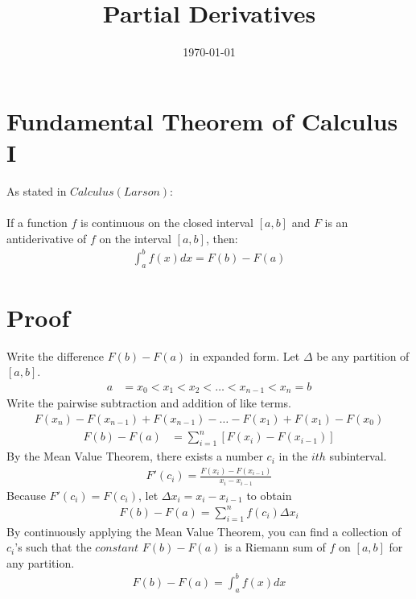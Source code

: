 \documentclass[a4paper, 12pt]{article}
\begin{document}
\title{Partial Derivatives}
\date{\today}
\pagestyle{empty} 
\section{Fundamental Theorem of Calculus I}
As stated in $Calculus(Larson)$: \\
\\
	If a function $f$ is continuous on the closed interval $[a, b]$ and $F$ is an antiderivative of $f$ on the interval $[a, b]$, then:
\begin{align}
	\int_a^b f(x) dx = F(b) - F(a)
\end{align}
\section{Proof}
	Write the difference $F(b) - F(a)$ in expanded form.  Let $\Delta$ be any partition of $[a, b]$.
\begin{align*}
	a &= x_0 < x_1 < x_2 < \ldots < x_{n-1} < x_n = b
\end{align*}
	Write the pairwise subtraction and addition of like terms.
\begin{align*}
	F(x_n) - F(x_{n-1}) + F(x_{n-1}) - \ldots - F(x_1) + F(x_1) - F(x_0)	
\end{align*}
\begin{align}
	F(b) - F(a) &= \displaystyle\sum_{i=1}^{n} [F(x_i) - F(x_{i-1})]
\end{align}
	By the Mean Value Theorem, there exists a number $c_i$ in the $ith$ subinterval.
\begin{align*}
	F'(c_i) = \frac{F(x_i) - F(x_{i-1})}{x_i - x_{i-1}}
\end{align*}	
	Because $F'(c_i) = F(c_i)$, let $\Delta x_i = x_i - x_{i-1}$ to obtain
\begin{align}
	F(b) - F(a) = \displaystyle\sum_{i=1}^{n} f(c_i) \Delta x_i
\end{align}
	By continuously applying the Mean Value Theorem, you can find a collection of $c_i$'s such that the $constant$ $F(b) - F(a)$ is a Riemann sum of $f$ on $[a, b]$ for any partition.  	
\begin{align*}
	F(b) - F(a) = \int_a^b f(x) dx 
\end{align*}
\end{document}
